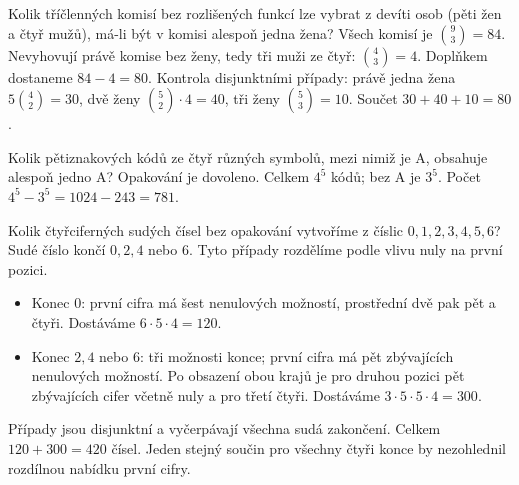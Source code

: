 \documentclass[11pt,a4paper]{article}
\begin{document}


\begin{prikladReseniBox}[title={Příklad P1}]
Kolik tříčlenných komisí bez rozlišených funkcí lze vybrat z devíti osob (pěti žen a čtyř mužů), má-li být v komisi alespoň jedna žena?
\tcblower
Všech komisí je $\binom93=84$. Nevyhovují právě komise bez ženy, tedy tři muži ze čtyř: $\binom43=4$. Doplňkem dostaneme $84-4=80$. Kontrola disjunktními případy: právě jedna žena $5\binom42=30$, dvě ženy $\binom52\cdot4=40$, tři ženy $\binom53=10$. Součet $30+40+10=80$.
\end{prikladReseniBox}


\begin{prikladReseniBox}[title={Příklad P2}]
Kolik pětiznakových kódů ze čtyř různých symbolů, mezi nimiž je A, obsahuje alespoň jedno A? Opakování je dovoleno.
\tcblower
Celkem \(4^5\) kódů; bez A je \(3^5\). Počet \(4^5-3^5=1024-243=781\).
\end{prikladReseniBox}


\begin{prikladReseniBox}[title={Příklad P3}]
Kolik čtyřciferných sudých čísel bez opakování vytvoříme z číslic $0,1,2,3,4,5,6$?
\tcblower
Sudé číslo končí $0,2,4$ nebo $6$. Tyto případy rozdělíme podle vlivu nuly na první pozici.
\begin{itemize}
\item Konec $0$: první cifra má šest nenulových možností, prostřední dvě pak pět a čtyři. Dostáváme $6\cdot5\cdot4=120$.
\item Konec $2,4$ nebo $6$: tři možnosti konce; první cifra má pět zbývajících nenulových možností. Po obsazení obou krajů je pro druhou pozici pět zbývajících cifer včetně nuly a pro třetí čtyři. Dostáváme $3\cdot5\cdot5\cdot4=300$.
\end{itemize}
Případy jsou disjunktní a vyčerpávají všechna sudá zakončení. Celkem $120+300=420$ čísel. Jeden stejný součin pro všechny čtyři konce by nezohlednil rozdílnou nabídku první cifry.
\end{prikladReseniBox}
\end{document}
